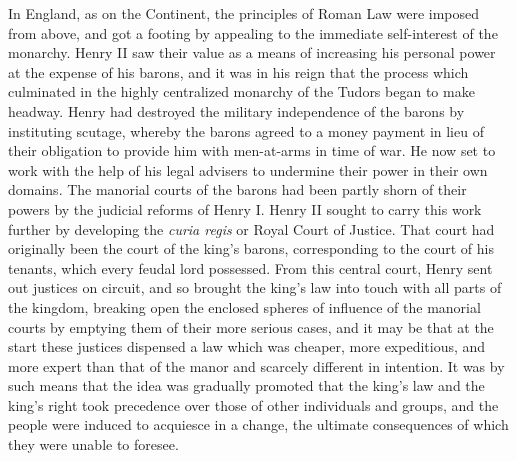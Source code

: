 \documentclass{book}
\begin{document}
In England, as on the Continent, the principles of Roman Law were imposed from above, and got a footing by appealing to the immediate self-interest of the monarchy. Henry II saw their value as a means of increasing his personal power at the expense of his barons, and it was in his reign that the process which culminated in the highly centralized monarchy of the Tudors began to make headway. Henry had destroyed the military independence of the barons by instituting scutage, whereby the barons agreed to a money payment in lieu of their obligation to provide him with men-at-arms in time of war. He now set to work with the help of his legal advisers to undermine their power in their own domains. The manorial courts of the barons had been partly shorn of their powers by the judicial reforms of Henry I. Henry II sought to carry this work further by developing the \emph{curia regis} or Royal Court of Justice. That court had originally been the court of the king’s barons, corresponding to the court of his tenants, which every feudal lord possessed. From this central court, Henry sent out justices on circuit, and so brought the king’s law into touch with all parts of the kingdom, breaking open the enclosed spheres of influence of the manorial courts by emptying them of their more serious cases, and it may be that at the start these justices dispensed a law which was cheaper, more expeditious, and more expert than that of the manor and scarcely different in intention. It was by such means that the idea was gradually promoted that the king’s law and the king’s right took precedence over those of other individuals and groups, and the people were induced to acquiesce in a change, the ultimate consequences of which they were unable to foresee.
\end{document}
